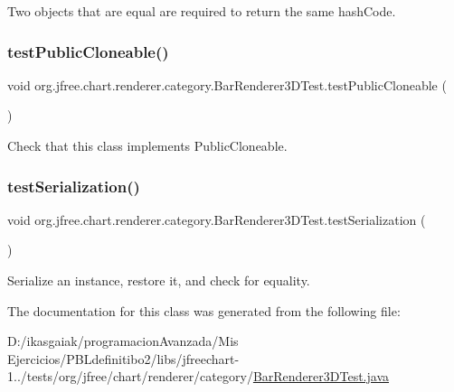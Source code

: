 Two objects that are equal are required to return the same hash\+Code. \mbox{\label{classorg_1_1jfree_1_1chart_1_1renderer_1_1category_1_1_bar_renderer3_d_test_a0a30c464e88fd5ce955562c01294ea78}} 
\subsubsection{\texorpdfstring{test\+Public\+Cloneable()}{testPublicCloneable()}}
{\footnotesize\ttfamily void org.\+jfree.\+chart.\+renderer.\+category.\+Bar\+Renderer3\+D\+Test.\+test\+Public\+Cloneable (\begin{DoxyParamCaption}{ }\end{DoxyParamCaption})}

Check that this class implements Public\+Cloneable. \mbox{\label{classorg_1_1jfree_1_1chart_1_1renderer_1_1category_1_1_bar_renderer3_d_test_a2c56c7b49fa6e54463ddbb839f8abecd}} 
\subsubsection{\texorpdfstring{test\+Serialization()}{testSerialization()}}
{\footnotesize\ttfamily void org.\+jfree.\+chart.\+renderer.\+category.\+Bar\+Renderer3\+D\+Test.\+test\+Serialization (\begin{DoxyParamCaption}{ }\end{DoxyParamCaption})}

Serialize an instance, restore it, and check for equality. 

The documentation for this class was generated from the following file\+:\begin{DoxyCompactItemize}
\item 
D\+:/ikasgaiak/programacion\+Avanzada/\+Mis Ejercicios/\+P\+B\+Ldefinitibo2/libs/jfreechart-\/1../tests/org/jfree/chart/renderer/category/\mbox{\hyperlink{_bar_renderer3_d_test_8java}{Bar\+Renderer3\+D\+Test.\+java}}\end{DoxyCompactItemize}
